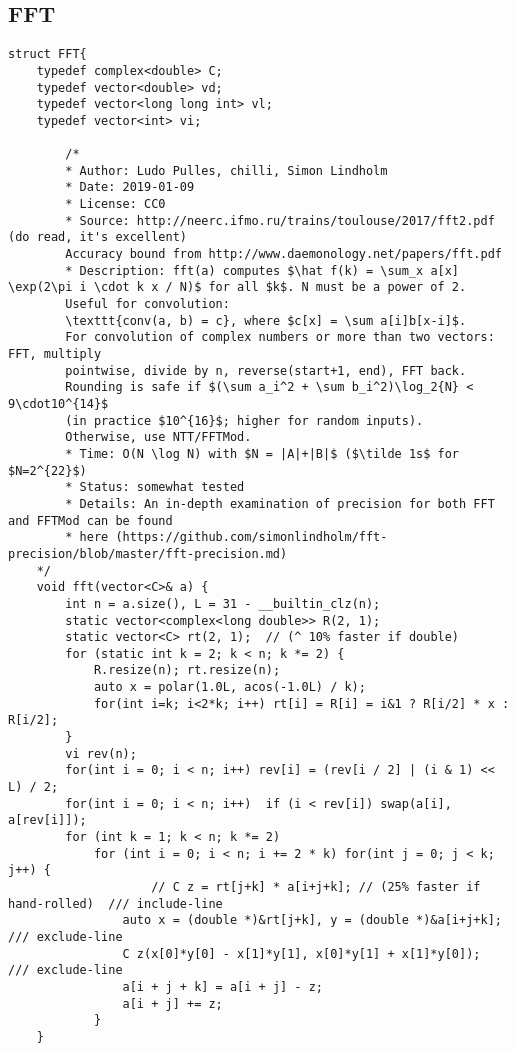 \documentclass[11pt, a4paper, twoside]{article}
\begin{document}
\subsection{FFT}
\begin{verbatim}
struct FFT{
    typedef complex<double> C;
    typedef vector<double> vd;
    typedef vector<long long int> vl;
    typedef vector<int> vi;
     
        /*
        * Author: Ludo Pulles, chilli, Simon Lindholm
        * Date: 2019-01-09
        * License: CC0
        * Source: http://neerc.ifmo.ru/trains/toulouse/2017/fft2.pdf (do read, it's excellent)
        Accuracy bound from http://www.daemonology.net/papers/fft.pdf
        * Description: fft(a) computes $\hat f(k) = \sum_x a[x] \exp(2\pi i \cdot k x / N)$ for all $k$. N must be a power of 2.
        Useful for convolution:
        \texttt{conv(a, b) = c}, where $c[x] = \sum a[i]b[x-i]$.
        For convolution of complex numbers or more than two vectors: FFT, multiply
        pointwise, divide by n, reverse(start+1, end), FFT back.
        Rounding is safe if $(\sum a_i^2 + \sum b_i^2)\log_2{N} < 9\cdot10^{14}$
        (in practice $10^{16}$; higher for random inputs).
        Otherwise, use NTT/FFTMod.
        * Time: O(N \log N) with $N = |A|+|B|$ ($\tilde 1s$ for $N=2^{22}$)
        * Status: somewhat tested
        * Details: An in-depth examination of precision for both FFT and FFTMod can be found
        * here (https://github.com/simonlindholm/fft-precision/blob/master/fft-precision.md)
    */
    void fft(vector<C>& a) {
        int n = a.size(), L = 31 - __builtin_clz(n);
        static vector<complex<long double>> R(2, 1);
        static vector<C> rt(2, 1);  // (^ 10% faster if double)
        for (static int k = 2; k < n; k *= 2) {
            R.resize(n); rt.resize(n);
            auto x = polar(1.0L, acos(-1.0L) / k);
            for(int i=k; i<2*k; i++) rt[i] = R[i] = i&1 ? R[i/2] * x : R[i/2];
        }
        vi rev(n);
        for(int i = 0; i < n; i++) rev[i] = (rev[i / 2] | (i & 1) << L) / 2;
        for(int i = 0; i < n; i++)  if (i < rev[i]) swap(a[i], a[rev[i]]);
        for (int k = 1; k < n; k *= 2)
            for (int i = 0; i < n; i += 2 * k) for(int j = 0; j < k; j++) {
                    // C z = rt[j+k] * a[i+j+k]; // (25% faster if hand-rolled)  /// include-line
                auto x = (double *)&rt[j+k], y = (double *)&a[i+j+k];        /// exclude-line
                C z(x[0]*y[0] - x[1]*y[1], x[0]*y[1] + x[1]*y[0]);           /// exclude-line
                a[i + j + k] = a[i + j] - z;
                a[i + j] += z;
            }
    }
        

\end{verbatim}
\end{document}
